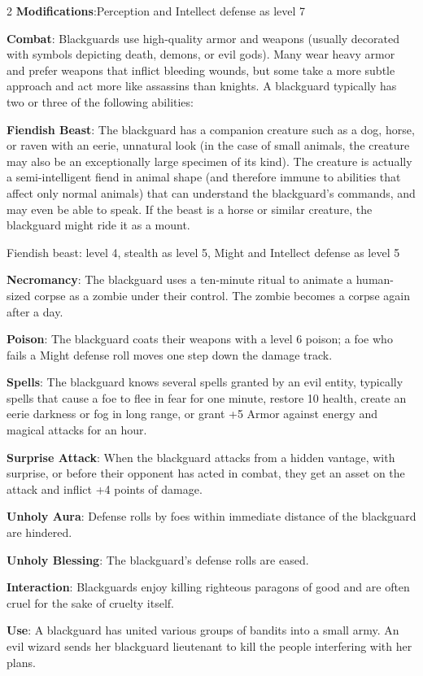 \begin{multicols}{2}
\textbf{Modifications}:Perception and Intellect defense as level 7 

\textbf{Combat}: Blackguards use high-quality armor and weapons (usually decorated with symbols depicting death, demons, or evil gods). Many wear heavy armor and prefer weapons that inflict bleeding wounds, but some take a more subtle approach and act more like assassins than knights. A blackguard typically has two or three of the following abilities: 

\textbf{Fiendish Beast}: The blackguard has a companion creature such as a dog, horse, or raven with an eerie, unnatural look (in the case of small animals, the creature may also be an exceptionally large specimen of its kind). The creature is actually a semi-intelligent fiend in animal shape (and therefore immune to abilities that affect only normal animals) that can understand the blackguard’s commands, and may even be able to speak. If the beast is a horse or similar creature, the blackguard might ride it as a mount. 

Fiendish beast: level 4, stealth as level 5, Might and Intellect defense as level 5

\textbf{Necromancy}: The blackguard uses a ten-minute ritual to animate a human-sized corpse as a zombie under their control. The zombie becomes a corpse again after a day. 

\textbf{Poison}: The blackguard coats their weapons with a level 6 poison; a foe who fails a Might defense roll moves one step down the damage track. 

\textbf{Spells}: The blackguard knows several spells granted by an evil entity, typically spells that cause a foe to flee in fear for one minute, restore 10 health, create an eerie darkness or fog in long range, or grant +5 Armor against energy and magical attacks for an hour. 

\textbf{Surprise Attack}: When the blackguard attacks from a hidden vantage, with surprise, or before their opponent has acted in combat, they get an asset on the attack and inflict +4 points of damage.

\textbf{Unholy Aura}: Defense rolls by foes within immediate distance of the blackguard are hindered. 

\textbf{Unholy Blessing}: The blackguard’s defense rolls are eased. 

\textbf{Interaction}: Blackguards enjoy killing righteous paragons of good and are often cruel for the sake of cruelty itself. 

\textbf{Use}: A blackguard has united various groups of bandits into a small army. An evil wizard sends her blackguard lieutenant to kill the people interfering with her plans. 


\end{multicols}
